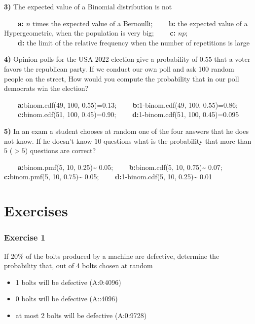 \documentclass[
]{book}
\providecommand{\tightlist}{%
  \setlength{\itemsep}{0pt}\setlength{\parskip}{0pt}}
\begin{document}
\textbf{3)} The expected value of a Binomial distribution is not

\textbf{\(\qquad\)a:} \(n\) times the expected value of a Bernoulli;
\textbf{\(\qquad\)b:} the expected value of a Hypergeometric, when the population is very big;
\textbf{\(\qquad\)c:} \(np\);\\
\textbf{\(\qquad\)d:} the limit of the relative frequency when the number of repetitions is large

\textbf{4)} Opinion polls for the USA 2022 election give a probability of \(0.55\) that a voter favors the republican party. If we conduct our own poll and ask 100 random people on the street, How would you compute the probability that in our poll democrats win the election?

\textbf{\(\qquad\)a:}binom.cdf(49, 100, 0.55)=0.13;
\textbf{\(\qquad\)b:}1-binom.cdf(49, 100, 0.55)=0.86;
\textbf{\(\qquad\)c:}binom.cdf(51, 100, 0.45)=0.90; \textbf{\(\qquad\)d:}1-binom.cdf(51, 100, 0.45)=0.095

\textbf{5)} In an exam a student chooses at random one of the four answers that he does not know. If he doesn't know \(10\) questions what is the probability that more than \(5\) (\(>5\)) questions are correct?

\textbf{\(\qquad\)a:}binom.pmf(5, 10, 0.25)\textasciitilde{} 0.05; \textbf{\(\qquad\)b:}binom.cdf(5, 10, 0.75)\textasciitilde{} 0.07; \textbf{\(\qquad\)c:}binom.pmf(5, 10, 0.75)\textasciitilde{} 0.05; \textbf{\(\qquad\)d:}1-binom.cdf(5, 10, 0.25)\textasciitilde{} 0.01

\hypertarget{exercises-5}{%
\section{Exercises}\label{exercises-5}}

\hypertarget{exercise-1-4}{%
\subsubsection{Exercise 1}\label{exercise-1-4}}

If 20\% of the bolts produced by a machine are defective, determine the probability that, out of
4 bolts chosen at random

\begin{itemize}
\tightlist
\item
  1 bolts will be defective (A:0:4096)
\item
  0 bolts will be defective (A::4096)
\item
  at most 2 bolts will be defective (A:0:9728)
\end{itemize}
\end{document}
